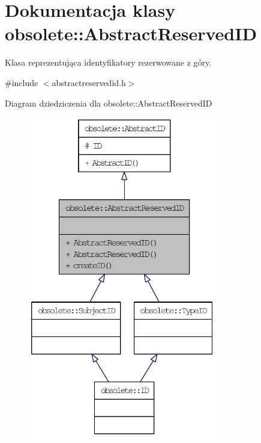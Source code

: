 \hypertarget{classobsolete_1_1AbstractReservedID}{
\section{Dokumentacja klasy obsolete::AbstractReservedID}
\label{classobsolete_1_1AbstractReservedID}
}


Klasa reprezentująca identyfikatory rezerwowane z góry.  




{\ttfamily \#include $<$abstractreservedid.h$>$}



Diagram dziedziczenia dla obsolete::AbstractReservedID\nopagebreak
\begin{figure}[H]
\begin{center}
\leavevmode
\includegraphics[height=400pt]{classobsolete_1_1AbstractReservedID__inherit__graph}
\end{center}
\end{figure}


